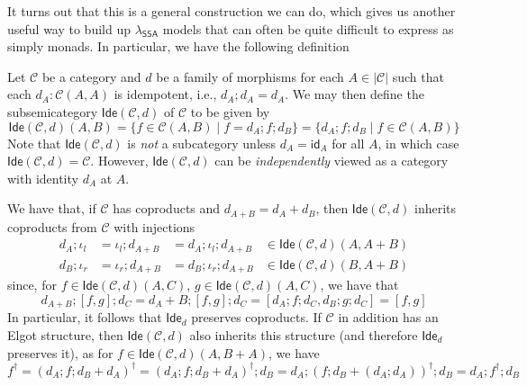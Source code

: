 \documentclass[acmsmall,screen,review]{acmart}
\newcommand{\mc}[1]{\ensuremath{\mathcal{#1}}}
\newcommand{\ms}[1]{\ensuremath{\mathsf{#1}}}
\newcommand{\isotopessa}{\(\lambda_{\ms{SSA}}\)}
\begin{document}
It turns out that this is a general construction we can do, which gives us another useful way to
build up \isotopessa{} models that can often be quite difficult to express as simply monads.
In particular, we have the following definition
\begin{definition}
  Let $\mc{C}$ be a category and $d$ be a family of morphisms for each $A \in |\mc{C}|$ such that
  each $d_A : \mc{C}(A, A)$ is idempotent, i.e., $d_A ; d_A = d_A$. We may then define the
  subsemicategory $\ms{Ide}(\mc{C}, d)$ of $\mc{C}$ to be given by
  \begin{equation}
    \ms{Ide}(\mc{C}, d)(A, B) 
      = \{f \in \mc{C}(A, B) \mid f = d_A ; f ; d_B\}
      = \{d_A ; f ; d_B \mid f \in \mc{C}(A, B)\}
  \end{equation}
  Note that $\ms{Ide}(\mc{C}, d)$ is \emph{not} a subcategory unless $d_A = \ms{id}_A$ for all $A$,
  in which case $\ms{Ide}(\mc{C}, d) = \mc{C}$. However, $\ms{Ide}(\mc{C}, d)$ can be
  \emph{independently} viewed as a category with identity $d_A$ at $A$.
\end{definition}
We have that, if $\mc{C}$ has coproducts and $d_{A + B} = d_A + d_B$, then $\ms{Ide}(\mc{C}, d)$
inherits coproducts from $\mc{C}$ with injections 
\begin{equation}
  \begin{aligned}
    d_A;\iota_l &= \iota_l;d_{A + B} &= d_A;\iota_l;d_{A + B} &\in \ms{Ide}(\mc{C}, d)(A, A + B) 
    \\
    d_B;\iota_r &= \iota_r;d_{A + B} &= d_B;\iota_r;d_{A + B} &\in \ms{Ide}(\mc{C}, d)(B, A + B)
  \end{aligned}
\end{equation}
since, for $f \in \ms{Ide}(\mc{C}, d)(A, C)$, $g \in \ms{Ide}(\mc{C}, d)(A, C)$, we have that
\begin{equation}
  d_{A + B} ; [f, g] ; d_C 
  = d_A + B ; [f, g] ; d_C
  = [d_A ; f ; d_C, d_B ; g ; d_C]
  = [f, g]
\end{equation}
In particular, it follows that $\ms{Ide}_d$ preserves coproducts. If $\mc{C}$ in addition has an
Elgot structure, then $\ms{Ide}(\mc{C}, d)$ also inherits this structure (and therefore $\ms{Ide}_d$
preserves it), as for $f \in \ms{Ide}(\mc{C}, d)(A, B + A)$, we have
\begin{equation}
  f^\dagger 
  = (d_A ; f ; d_B + d_A)^\dagger 
  = (d_A ; f ; d_B + d_A)^\dagger ; d_B
  = d_A ; (f ; d_B + (d_A ; d_A))^\dagger ; d_B
  = d_A ; f^\dagger ; d_B
\end{equation}
\end{document}
